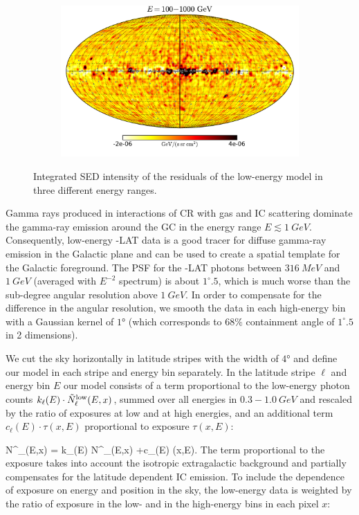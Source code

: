 \begin{figure}[t]
{\begin{subfigure}{0.3\textwidth}
        	\includegraphics[width=\textwidth]{plots/Mollweide_LowE_03-10GeV_flux_source_range_2.pdf}
    	\end{subfigure}
    }
  	\caption{Integrated SED intensity of the residuals of the low-energy model in three different energy ranges. }
  	\label{fig:Maps_lowE}
\end{figure}

Gamma rays produced in interactions of CR with gas and IC scattering dominate the gamma-ray emission around the GC in the energy range $E \lesssim \SI{1}{GeV}$. 
Consequently, low-energy \Fermi-LAT data is a good tracer for diffuse gamma-ray emission in the Galactic plane and can be used to create a spatial template for the Galactic foreground.
The PSF for the \Fermi-LAT photons between $\SI{316}{MeV}$ and $\SI{1}{GeV}$ (averaged with $E^{-2}$ spectrum) is about $1^\circ\!\!.5$,
which is much worse than the sub-degree angular resolution above $\SI{1}{GeV}$.
In order to compensate for the difference in the angular resolution, 
we smooth the data in each high-energy bin with a Gaussian kernel of $\ang{1}$ (which corresponds to $68\%$ containment angle of
$1^\circ\!\!.5$ in 2 dimensions).

We cut the sky horizontally in latitude stripes with the width of $\ang{4}$ and define our model in each stripe and energy bin separately. 
In the latitude stripe $\ell$ and energy bin $E$ our model consists of a term proportional to the low-energy photon counts 
$k_{\ell}(E) \cdot \tilde N^{\text{low}}_\ell(E, x)$, summed over all energies in $0.3 - \SI{1.0}{GeV}$ 
and rescaled by the ratio of exposures at low and at high energies,
and an additional term $c_\ell(E) \cdot \tau(x,E)$ proportional to exposure $\tau(x,E)$:

\be
N^\model_{\ell}(E,x) = k_{\ell}(E) \cdot \tilde N^\low_{\ell}(E,x) +c_\ell(E) \cdot \tau(x,E).
\ee
The term proportional to the exposure takes into account the isotropic extragalactic background and partially compensates for the latitude dependent IC emission. To include the dependence of exposure on energy and position in the sky, the low-energy data is weighted by the ratio of exposure in the low- and in the high-energy bins in each pixel $x$:

